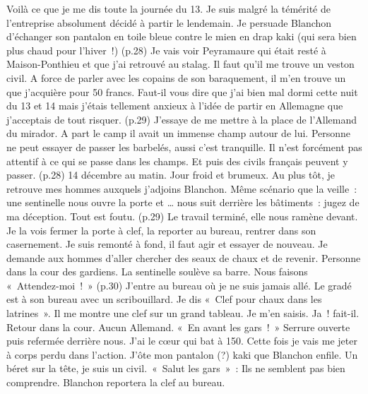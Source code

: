 \documentclass[a5paper,pagesize,10pt,bibtotoc,pointlessnumbers,
normalheadings,DIV=9,twoside=false]{scrbook}
\begin{document}
	Voilà ce que je me dis toute la journée du 13. Je suis malgré la témérité de l’entreprise absolument décidé à partir le lendemain. Je persuade Blanchon d’échanger son pantalon en toile bleue contre le mien en drap kaki (qui sera bien plus chaud pour l’hiver !) (p.28) Je vais voir Peyramaure qui était resté à Maison-Ponthieu et que j’ai retrouvé au stalag. Il faut qu’il me trouve un veston civil. A force de parler avec les copains de son baraquement, il m’en trouve un que j’acquière pour 50 francs.
	Faut-il vous dire que j’ai bien mal dormi cette nuit du 13 et 14 mais j’étais tellement anxieux à l’idée de partir en Allemagne que j’acceptais de tout risquer. (p.29) J’essaye de me mettre à la place de l’Allemand du mirador. A part le camp il avait un immense champ autour de lui. Personne ne peut essayer de passer les barbelés, aussi c’est tranquille. Il n’est forcément pas attentif à ce qui se passe dans les champs. Et puis des civils français peuvent y passer. (p.28)
	14 décembre au matin. Jour froid et brumeux. Au plus tôt, je retrouve mes hommes auxquels j’adjoins Blanchon. Même scénario que la veille : une sentinelle nous ouvre la porte et … nous suit derrière les bâtiments : jugez de ma déception. Tout est foutu.
	(p.29) Le travail terminé, elle nous ramène devant. Je la vois fermer la porte à clef, la reporter au bureau, rentrer dans son casernement.
	Je suis remonté à fond, il faut agir et essayer de nouveau. Je demande aux hommes d’aller chercher des seaux de chaux et de revenir. Personne dans la cour des gardiens. La sentinelle soulève sa barre. Nous faisons « Attendez-moi ! » (p.30) J’entre au bureau où je ne suis jamais allé. Le gradé est à son bureau avec un scribouillard. Je dis « Clef pour chaux dans les latrines ». Il me montre une clef sur un grand tableau. Je m’en saisis. Ja ! fait-il. Retour dans la cour. Aucun Allemand. « En avant les gars ! » Serrure ouverte puis refermée derrière nous. J’ai le cœur qui bat à 150. Cette fois je vais me jeter à corps perdu dans l’action. J’ôte mon pantalon (?) kaki que Blanchon enfile. Un béret sur la tête, je suis un civil. « Salut les gars » : Ils ne semblent pas bien comprendre. Blanchon reportera la clef au bureau. 
\end{document}
